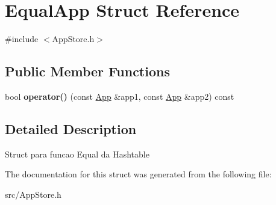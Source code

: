 \hypertarget{struct_equal_app}{\section{Equal\+App Struct Reference}
\label{struct_equal_app}
}


{\ttfamily \#include $<$App\+Store.\+h$>$}

\subsection*{Public Member Functions}
\begin{DoxyCompactItemize}
\item 
\hypertarget{struct_equal_app_a15c9f669c415573729a3a0a8908b016c}{bool {\bfseries operator()} (const \hyperlink{class_app}{App} \&app1, const \hyperlink{class_app}{App} \&app2) const }\label{struct_equal_app_a15c9f669c415573729a3a0a8908b016c}

\end{DoxyCompactItemize}


\subsection{Detailed Description}
Struct para funcao Equal da Hashtable 

The documentation for this struct was generated from the following file\+:\begin{DoxyCompactItemize}
\item 
src/App\+Store.\+h\end{DoxyCompactItemize}

